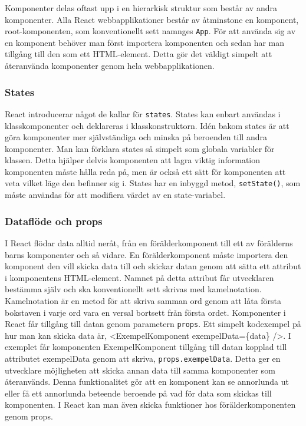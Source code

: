 Komponenter delas oftast upp i en hierarkisk struktur som består av andra komponenter. Alla React webbapplikationer består av åtminstone en komponent, root-komponenten, som konventionellt sett namnges \texttt{App}. För att använda sig av en komponent behöver man först importera komponenten och sedan har man tillgång till den som ett HTML-element. Detta gör det väldigt simpelt att återanvända komponenter genom hela webbapplikationen.



\subsubsection{States} 
React introducerar något de kallar för \texttt{states}.\cite{react-states} States kan enbart användas i klasskomponenter och deklareras i klasskonstruktorn. Idén bakom states är att göra komponenter mer självständiga och minska på beroenden till andra komponenter. Man kan förklara states så simpelt som globala variabler för klassen. Detta hjälper delvis komponenten att lagra viktig information komponenten måste hålla reda på, men är också ett sätt för komponenten att veta vilket läge den befinner sig i. States har en inbyggd metod, \texttt{setState()}, som måste användas för att modifiera värdet av en state-variabel. 

\subsubsection{Dataflöde och props}
I React flödar data alltid neråt\cite{react-states}, från en förälderkomponent till ett av förälderns barns komponenter och så vidare. En förälderkomponent måste importera den komponent den vill skicka data till och skickar datan genom att sätta ett attribut i komponentens HTML-element. Namnet på detta attribut får utvecklaren bestämma själv och ska konventionellt sett skrivas med kamelnotation. Kamelnotation är en metod för att skriva samman ord genom att låta första bokstaven i varje ord vara en versal bortsett från första ordet. Komponenter i React får tillgång till datan genom parametern \texttt{props}. Ett simpelt kodexempel på hur man kan skicka data är, <ExempelKomponent exempelData=\{data\} />. I exemplet får komponenten ExempelKomponent tillgång till datan kopplad till attributet exempelData genom att skriva, \texttt{props.exempelData}. Detta ger en utvecklare möjligheten att skicka annan data till samma komponenter som återanvänds. Denna funktionalitet gör att en komponent kan se annorlunda ut eller få ett annorlunda beteende beroende på vad för data som skickas till komponenten. I React kan man även skicka funktioner hos förälderkomponenten genom props. 
